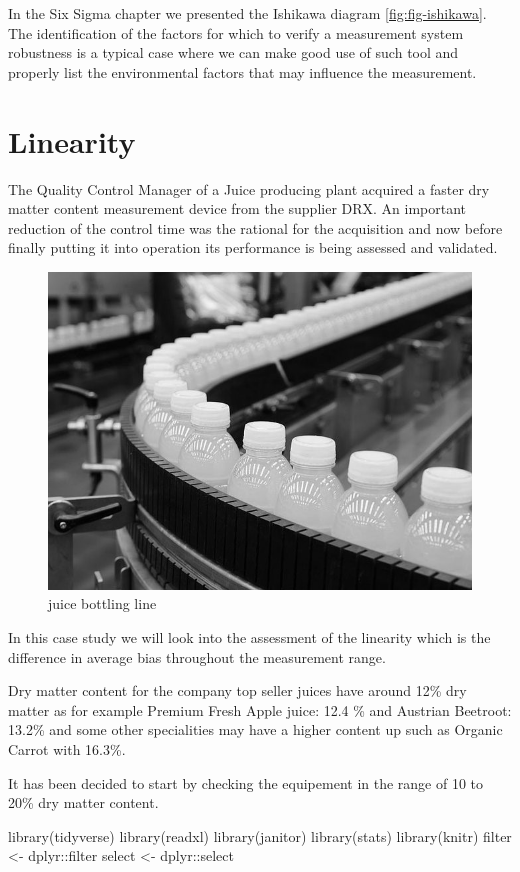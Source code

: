 \documentclass[
]{book}
\newenvironment{Shaded}{\begin{snugshade}}{\end{snugshade}}
\newcommand{\FunctionTok}[1]{\textcolor[rgb]{0.00,0.00,0.00}{#1}}
\newcommand{\NormalTok}[1]{#1}
\newcommand{\OtherTok}[1]{\textcolor[rgb]{0.56,0.35,0.01}{#1}}
\newcommand{\SpecialCharTok}[1]{\textcolor[rgb]{0.00,0.00,0.00}{#1}}
\begin{document}
In the Six Sigma chapter we presented the Ishikawa diagram \ref{fig:fig-ishikawa}. The identification of the factors for which to verify a measurement system robustness is a typical case where we can make good use of such tool and properly list the environmental factors that may influence the measurement.

\hypertarget{linearity}{%
\section{Linearity}\label{linearity}}

The Quality Control Manager of a Juice producing plant acquired a faster dry matter content measurement device from the supplier DRX. An important reduction of the control time was the rational for the acquisition and now before finally putting it into operation its performance is being assessed and validated.

\begin{figure}

{\centering \includegraphics[width=0.6\linewidth]{img/juice_bottling_bw} 

}

\caption{juice bottling line}\label{fig:unnamed-chunk-2}
\end{figure}

In this case study we will look into the assessment of the linearity which is the difference in average bias throughout the measurement range.

Dry matter content for the company top seller juices have around 12\% dry matter as for example Premium Fresh Apple juice: 12.4 \% and Austrian Beetroot: 13.2\% and some other specialities may have a higher content up such as Organic Carrot with 16.3\%.

It has been decided to start by checking the equipement in the range of 10 to 20\% dry matter content.

\begin{Shaded}
\begin{Highlighting}[]
\FunctionTok{library}\NormalTok{(tidyverse)}
\FunctionTok{library}\NormalTok{(readxl)}
\FunctionTok{library}\NormalTok{(janitor)}
\FunctionTok{library}\NormalTok{(stats)}
\FunctionTok{library}\NormalTok{(knitr)}
\NormalTok{filter }\OtherTok{\textless{}{-}}\NormalTok{ dplyr}\SpecialCharTok{::}\NormalTok{filter}
\NormalTok{select }\OtherTok{\textless{}{-}}\NormalTok{ dplyr}\SpecialCharTok{::}\NormalTok{select}
\end{Highlighting}
\end{Shaded}
\end{document}
